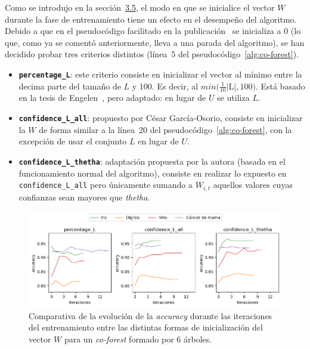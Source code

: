 Como se introdujo en la sección~\hyperref[s:discusion-paramentros-cof]{3.5}, el modo en que se inicialice el vector $W$ durante la fase de entrenamiento tiene un efecto en el desempeño del algoritmo. Debido a que en el pseudocódigo facilitado en la publicación~\cite{originalCoForest2007} se inicializa a 0 (lo que, como ya se comentó anteriormente, lleva a una parada del algoritmo), se han decidido probar tres criterios distintos (línea~5 del pseudocódigo~\ref{alg:co-forest}).

\begin{itemize}
	\item \textbf{\texttt{percentage\_L}}: este criterio consiste en inicializar el vector al mínimo entre la decima parte del tamaño de $L$ y 100. Es decir, al $min(\frac{1}{10}|$L$|, 100)$. Está basado en la tesis de Engelen~\cite{engelen2018thesis}, pero adaptado: en lugar de $U$ se utiliza $L$.
	\item \textbf{\texttt{confidence\_L\_all}}: propuesto por César García-Osorio, consiste en inicializar la $W$ de forma similar a la línea~20 del pseudocódigo~\ref{alg:co-forest}, con la excepción de usar el conjunto $L$ en lugar de $U$.
	\item \textbf{\texttt{confidence\_L\_thetha}}: adaptación propuesta por la autora (basada en el funcionamiento normal del algoritmo), consiste en realizar lo expuesto en \texttt{confidence\_L\_all} pero únicamente sumando a $W_{i,t}$ aquellos valores cuyas confianzas sean mayores que \textit{thetha}.
\end{itemize}

\begin{figure}[h]
	\caption[\textit{Co-Forest}: resultados (inicialización $W$ con 6 árboles)]{Comparativa de la evolución de la \textit{accuracy} durante las iteraciones del entrenamiento entre las distintas formas de inicialización del vector $W$ para un \textit{co-forest} formado por 6 árboles.}
	\label{img:w_init-6-trees}
	\centering
	\includegraphics[width=\textwidth]{../img/memoria/5_coforest_w-init_rd5_n6}
\end{figure}

